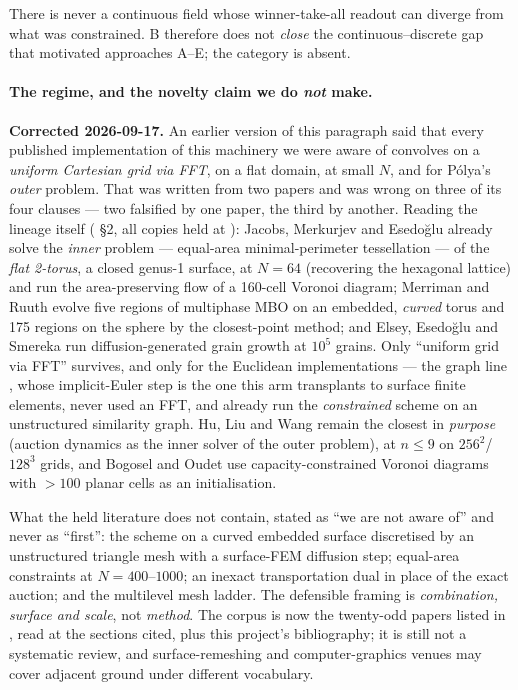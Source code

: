 \documentclass[11pt,a4paper]{article}
\begin{document}
There is never a continuous field whose winner-take-all readout can diverge from
what was constrained. B therefore does not \emph{close} the continuous--discrete
gap that motivated approaches A--E; the category is absent.

\paragraph{The regime, and the novelty claim we do \emph{not} make.}
\textbf{Corrected 2026-09-17.} An earlier version of this paragraph said that every
published implementation of this machinery we were aware of convolves on a
\emph{uniform Cartesian grid via FFT}, on a flat domain, at small \(N\), and for
P\'olya's \emph{outer} problem. That was written from two papers and was wrong on
three of its four clauses --- two falsified by one paper, the third by another.
Reading the lineage itself
( \S2, all copies held at
): Jacobs, Merkurjev and Esedo\u{g}lu
\cite[\S4.2]{jacobs2018auction} already solve the \emph{inner} problem --- equal-area
minimal-perimeter tessellation --- of the \emph{flat 2-torus}, a closed genus-1
surface, at \(N = 64\) (recovering the hexagonal lattice) and run the
area-preserving flow of a 160-cell Voronoi diagram; Merriman and Ruuth
\cite[\S8.3]{merriman2007surfaces} evolve five regions of multiphase MBO on an
embedded, \emph{curved} torus and 175 regions on the sphere by the
closest-point method; and Elsey,
Esedo\u{g}lu and Smereka \cite{elsey2009grain, elsey2011large} run
diffusion-generated grain growth at \(10^5\) grains. Only ``uniform grid via FFT''
survives, and only for the Euclidean implementations --- the graph line
\cite{garcia2014multiclass}, whose implicit-Euler step is the one this arm
transplants to surface finite elements, never used an FFT, and
\cite[\S5]{jacobs2018auction} already run the \emph{constrained} scheme on an
unstructured similarity graph. Hu, Liu and Wang
\cite{hu2024iterative} remain the closest in \emph{purpose} (auction dynamics as
the inner solver of the outer problem), at \(n \le 9\) on \(256^2\)/\(128^3\)
grids, and Bogosel and Oudet \cite{bogosel2021longest} use capacity-constrained
Voronoi diagrams with \(>100\) planar cells as an initialisation.

What the held literature does not contain, stated as ``we are not aware of'' and
never as ``first'': the scheme on a curved embedded surface discretised by an
unstructured triangle mesh with a surface-FEM diffusion step; equal-area
constraints at \(N = 400\)--\(1000\); an inexact transportation dual in place of
the exact auction; and the multilevel mesh ladder. The defensible framing is
\emph{combination, surface and scale}, not \emph{method}. The corpus is now the
twenty-odd papers listed in , read at the sections
cited, plus this project's bibliography; it is still not a systematic review, and
surface-remeshing and computer-graphics venues may cover adjacent ground under
different vocabulary.
\end{document}
